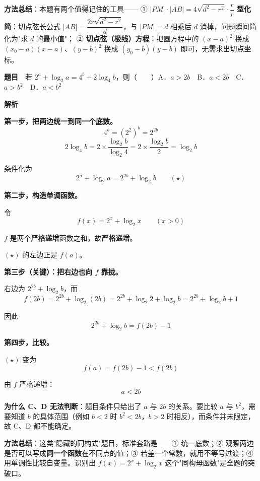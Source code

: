 
\begin{gktip}
\textbf{方法总结}：本题有两个值得记住的工具——
① \textbf{$|PM|\cdot|AB|=4\sqrt{d^2-r^2}\cdot\dfrac{r}{r}$ 型化简}：切点弦长公式 $|AB|=\dfrac{2r\sqrt{d^{2}-r^{2}}}d$，与 $|PM|=d$ 相乘后 $d$ 消掉，问题瞬间简化为"求 $d$ 的最小值"；
② \textbf{切点弦（极线）方程}：把圆方程中的 $(x-a)^2$ 换成 $(x_0-a)(x-a)$、$(y-b)^2$ 换成 $(y_0-b)(y-b)$ 即可，无需求出切点坐标。
\end{gktip}

\par\medskip


\textbf{题目}　若 $2^{a}+\log_2 a=4^{b}+2\log_4 b$，则（　　）A．$a>2b$　B．$a<2b$　C．$a>b^{2}$　D．$a<b^{2}$

\textbf{解析}

\textbf{第一步，把两边统一到同一个底数。}
\[4^{b}=\left(2^{2}\right)^{b}=2^{2b}\]
\[2\log_4 b=2\times\frac{\log_2 b}{\log_2 4}=2\times\frac{\log_2 b}2=\log_2 b\]

条件化为
\[2^{a}+\log_2 a=2^{2b}+\log_2 b\qquad(\star)\]

\textbf{第二步，构造单调函数。}

令
\[f(x)=2^{x}+\log_2 x\qquad(x>0)\]

$f$ 是两个\textbf{严格递增}函数之和，故\textbf{严格递增}。

$(\star)$ 的左边正是 $f(a)$。

\textbf{第三步（关键）：把右边也向 $f$ 靠拢。}

右边为 $2^{2b}+\log_2 b$，而
\[f(2b)=2^{2b}+\log_2(2b)=2^{2b}+\log_2 2+\log_2 b=2^{2b}+\log_2 b+1\]

因此
\[2^{2b}+\log_2 b=f(2b)-1\]

\textbf{第四步，比较。}

$(\star)$ 变为
\[f(a)=f(2b)-1<f(2b)\]

由 $f$ 严格递增：
\[a<2b\]


\begin{gktip}
\textbf{为什么 C、D 无法判断}：题目条件只给出了 $a$ 与 $2b$ 的关系。要比较 $a$ 与 $b^{2}$，需要知道 $b$ 的具体范围（例如 $b<2$ 时 $b^2<2b$，$b>2$ 时相反），而条件并未限定，故 C、D 都不能确定。

\textbf{方法总结}：这类"隐藏的同构式"题目，标准套路是——① 统一底数；② 观察两边是否可以写成\textbf{同一个函数}在不同点的值；③ 若差一个常数，就用不等号过渡；④ 用单调性比较自变量。识别出 $f(x)=2^{x}+\log_2 x$ 这个"同构母函数"是全题的突破口。
\end{gktip}

